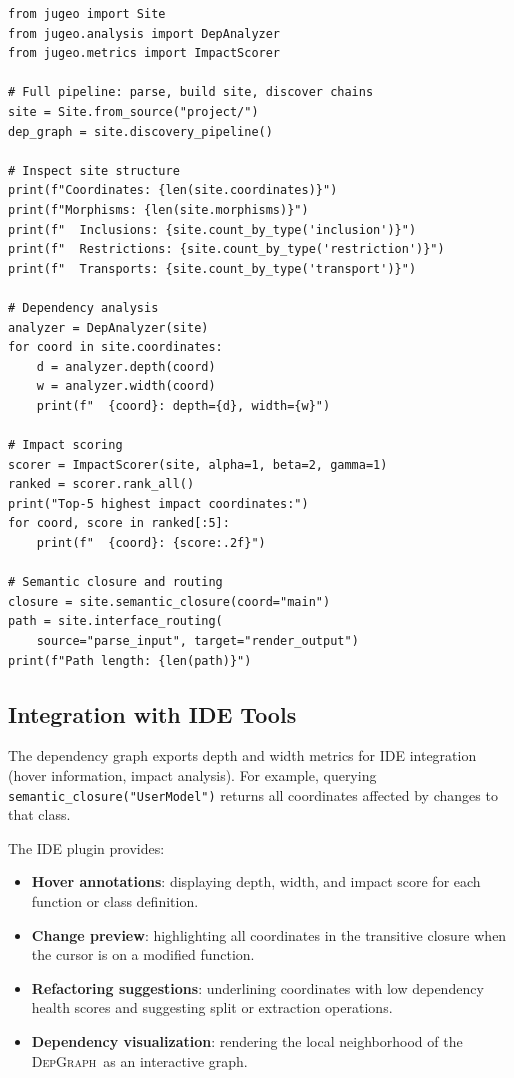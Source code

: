 \documentclass[11pt]{article}
\newcommand{\DepGraph}{\textsc{DepGraph}}
\newcommand{\DepDepth}{\mathrm{depth}}
\newcommand{\DepWidth}{\mathrm{width}}
\begin{document}
\begin{lstlisting}[style=jugeo-python]
from jugeo import Site
from jugeo.analysis import DepAnalyzer
from jugeo.metrics import ImpactScorer

# Full pipeline: parse, build site, discover chains
site = Site.from_source("project/")
dep_graph = site.discovery_pipeline()

# Inspect site structure
print(f"Coordinates: {len(site.coordinates)}")
print(f"Morphisms: {len(site.morphisms)}")
print(f"  Inclusions: {site.count_by_type('inclusion')}")
print(f"  Restrictions: {site.count_by_type('restriction')}")
print(f"  Transports: {site.count_by_type('transport')}")

# Dependency analysis
analyzer = DepAnalyzer(site)
for coord in site.coordinates:
    d = analyzer.depth(coord)
    w = analyzer.width(coord)
    print(f"  {coord}: depth={d}, width={w}")

# Impact scoring
scorer = ImpactScorer(site, alpha=1, beta=2, gamma=1)
ranked = scorer.rank_all()
print("Top-5 highest impact coordinates:")
for coord, score in ranked[:5]:
    print(f"  {coord}: {score:.2f}")

# Semantic closure and routing
closure = site.semantic_closure(coord="main")
path = site.interface_routing(
    source="parse_input", target="render_output")
print(f"Path length: {len(path)}")
\end{lstlisting}

\subsection{Integration with IDE Tools}
The dependency graph exports depth and width metrics for IDE integration
(hover information, impact analysis).  For example, querying
\texttt{semantic\_closure("UserModel")} returns all coordinates affected by
changes to that class.

The IDE plugin provides:
\begin{itemize}[noitemsep]
  \item \textbf{Hover annotations}: displaying $\DepDepth$, $\DepWidth$,
        and impact score for each function or class definition.
  \item \textbf{Change preview}: highlighting all coordinates in the
        transitive closure when the cursor is on a modified function.
  \item \textbf{Refactoring suggestions}: underlining coordinates with
        low dependency health scores and suggesting split or extraction
        operations.
  \item \textbf{Dependency visualization}: rendering the local
        neighborhood of the \DepGraph\ as an interactive graph.
\end{itemize}
\end{document}
